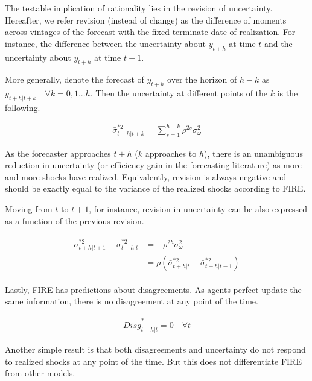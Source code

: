 \documentclass[12pt]{article}
\begin{document}
	The testable implication of rationality lies in the revision of uncertainty. Hereafter, we refer revision (instead of change) as the difference of moments across vintages of the forecast with the fixed terminate date of realization. For instance, the difference between the uncertainty about $y_{t+h}$ at time $t$ and the uncertainty about $y_{t+h}$ at time $t-1$.
	
	
	
	More generally,  denote the forecast of $y_{t+h}$ over the horizon of $h-k$ as $y_{t+h|t+k} \quad \forall k =0,1...h$. Then the uncertainty at different points of the $k$ is the following. 
	
	\begin{eqnarray}\label{VarREPop}
		\bar \sigma^{*2}_{t+h|t+k} = \sum^{h-k}_{s=1}\rho^{2s} \sigma^2_{\omega}
	\end{eqnarray}
	
	As the forecaster approaches $t+h$ ($k$ approaches to $h$), there is an unambiguous reduction in uncertainty (or efficiency gain in the forecasting literature) as more and more shocks have realized. Equivalently, revision is always negative and should be exactly equal to the variance of the realized shocks according to FIRE. 
	
	Moving from $t$ to $t+1$, for instance, revision in uncertainty can be also expressed as a function of the previous revision.  
	
	\begin{eqnarray}\label{VarREPopRv}
		\begin{aligned}
			\bar \sigma^{*2}_{t+h|t+1} - \bar \sigma^{*2}_{t+h|t} & = - \rho^{2h}\sigma^2_\omega \\
			& =  \rho (\bar \sigma^{*2}_{t+h|t} - \bar \sigma^{*2}_{t+h|t-1})
		\end{aligned}
	\end{eqnarray}
	
	Lastly, FIRE has predictions about disagreements. As agents perfect update the same information, there is no disagreement at any point of the time. 
	
	\begin{eqnarray}\label{DisgREPop}
		\overline{Disg}^{*}_{t+h|t}=0 \quad \forall t
	\end{eqnarray}
	
	Another simple result is that both disagreements and uncertainty do not respond to realized shocks at any point of the time. But this does not differentiate FIRE from other models. 
	
\end{document}
